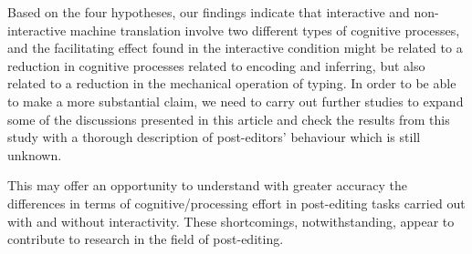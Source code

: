 \documentclass[output=paper]{langsci/langscibook}
\begin{document}
Based on the four hypotheses, our findings indicate that interactive and non-interactive machine translation involve two different types of cognitive processes, and the facilitating effect found in the interactive condition might be related to a reduction in cognitive processes related to encoding and inferring, but also related to a reduction in the mechanical operation of typing. In order to be able to make a more substantial claim, we need to carry out further studies to expand some of the discussions presented in this article and check the results from this study with a thorough description of post-editors’ behaviour which is still unknown.  



This may offer an opportunity to understand with greater accuracy the differences in terms of cognitive/processing effort in post-editing tasks carried out with and without interactivity. These shortcomings, notwithstanding, appear to contribute to research in the field of post-editing.
\end{document}
